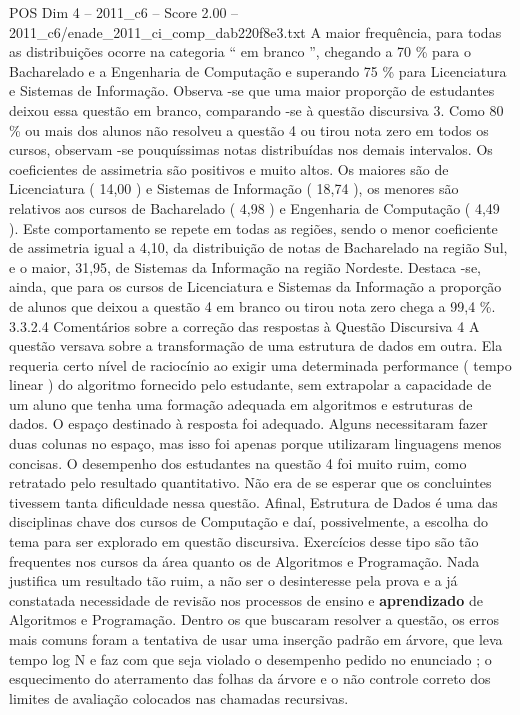 \begin{textsample}{POS Dim 4 – 2011\_c6 – Score 2.00 – 2011\_c6/enade\_2011\_ci\_comp\_dab220f8e3.txt}
A maior frequência, para todas as distribuições ocorre na categoria “ em branco ”, chegando a 70 \% para o Bacharelado e a Engenharia de Computação e superando 75 \% para Licenciatura e Sistemas de Informação.
Observa -se que uma maior proporção de estudantes deixou essa questão em branco, comparando -se à questão discursiva 3.
Como 80 \% ou mais dos alunos não resolveu a questão 4 ou tirou nota zero em todos os cursos, observam -se pouquíssimas notas distribuídas nos demais intervalos.
Os coeficientes de assimetria são positivos e muito altos.
Os maiores são de Licenciatura ( 14,00 ) e Sistemas de Informação ( 18,74 ), os menores são relativos aos cursos de Bacharelado ( 4,98 ) e Engenharia de Computação ( 4,49 ).
Este comportamento se repete em todas as regiões, sendo o menor coeficiente de assimetria igual a 4,10, da distribuição de notas de Bacharelado na região Sul, e o maior, 31,95, de Sistemas da Informação na região Nordeste.
Destaca -se, ainda, que para os cursos de Licenciatura e Sistemas da Informação a proporção de alunos que deixou a questão 4 em branco ou tirou nota zero chega a 99,4 \%. 3.3.2.4 Comentários sobre a correção das respostas à Questão Discursiva 4 A questão versava sobre a transformação de uma estrutura de dados em outra.
Ela requeria certo nível de raciocínio ao exigir uma determinada performance ( tempo linear ) do algoritmo fornecido pelo estudante, sem extrapolar a capacidade de um aluno que tenha uma formação adequada em algoritmos e estruturas de dados.
O espaço destinado à resposta foi adequado.
Alguns necessitaram fazer duas colunas no espaço, mas isso foi apenas porque utilizaram linguagens menos concisas.
O desempenho dos estudantes na questão 4 foi muito ruim, como retratado pelo resultado quantitativo.
Não era de se esperar que os concluintes tivessem tanta dificuldade nessa questão.
Afinal, Estrutura de Dados é uma das disciplinas chave dos cursos de Computação e daí, possivelmente, a escolha do tema para ser explorado em questão discursiva.
Exercícios desse tipo são tão frequentes nos cursos da área quanto os de Algoritmos e Programação.
Nada justifica um resultado tão ruim, a não ser o desinteresse pela prova e a já constatada necessidade de revisão nos processos de ensino e \textbf{aprendizado} de Algoritmos e Programação.
Dentro os que buscaram resolver a questão, os erros mais comuns foram a tentativa de usar uma inserção padrão em árvore, que leva tempo log N e faz com que seja violado o desempenho pedido no enunciado ; o esquecimento do aterramento das folhas da árvore e o não controle correto dos limites de avaliação colocados nas chamadas recursivas.

\end{textsample}
